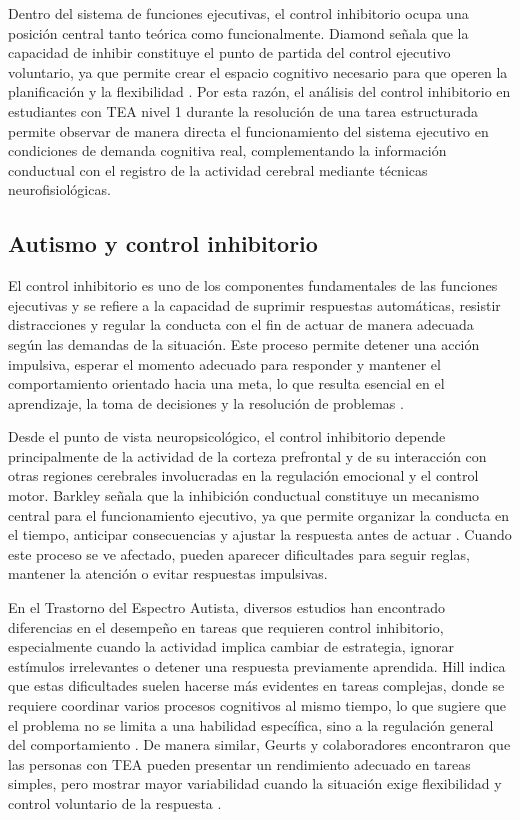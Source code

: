\documentclass{book}
\begin{document}
Dentro del sistema de funciones ejecutivas, el control 
inhibitorio ocupa una posición central tanto teórica como 
funcionalmente. Diamond señala que la capacidad de inhibir 
constituye el punto de partida del control ejecutivo 
voluntario, ya que permite crear el espacio cognitivo 
necesario para que operen la planificación y la 
flexibilidad \cite{Diamond2013}. Por esta razón, el 
análisis del control inhibitorio en estudiantes con TEA 
nivel 1 durante la resolución de una tarea estructurada 
permite observar de manera directa el funcionamiento del 
sistema ejecutivo en condiciones de demanda cognitiva 
real, complementando la información conductual con el 
registro de la actividad cerebral mediante técnicas 
neurofisiológicas.



\subsection{Autismo y control inhibitorio}

El control inhibitorio es uno de los componentes fundamentales de las funciones ejecutivas y se refiere a la capacidad de suprimir respuestas automáticas, resistir distracciones y regular la conducta con el fin de actuar de manera adecuada según las demandas de la situación. Este proceso permite detener una acción impulsiva, esperar el momento adecuado para responder y mantener el comportamiento orientado hacia una meta, lo que resulta esencial en el aprendizaje, la toma de decisiones y la resolución de problemas \cite{Diamond2013, Miyake2000}.

Desde el punto de vista neuropsicológico, el control inhibitorio depende principalmente de la actividad de la corteza prefrontal y de su interacción con otras regiones cerebrales involucradas en la regulación emocional y el control motor. Barkley señala que la inhibición conductual constituye un mecanismo central para el funcionamiento ejecutivo, ya que permite organizar la conducta en el tiempo, anticipar consecuencias y ajustar la respuesta antes de actuar \cite{Barkley1997}. Cuando este proceso se ve afectado, pueden aparecer dificultades para seguir reglas, mantener la atención o evitar respuestas impulsivas.

En el Trastorno del Espectro Autista, diversos estudios han encontrado diferencias en el desempeño en tareas que requieren control inhibitorio, especialmente cuando la actividad implica cambiar de estrategia, ignorar estímulos irrelevantes o detener una respuesta previamente aprendida. Hill indica que estas dificultades suelen hacerse más evidentes en tareas complejas, donde se requiere coordinar varios procesos cognitivos al mismo tiempo, lo que sugiere que el problema no se limita a una habilidad específica, sino a la regulación general del comportamiento \cite{Hill2004}. De manera similar, Geurts y colaboradores encontraron que las personas con TEA pueden presentar un rendimiento adecuado en tareas simples, pero mostrar mayor variabilidad cuando la situación exige flexibilidad y control voluntario de la respuesta \cite{Geurts2009}.
\end{document}
